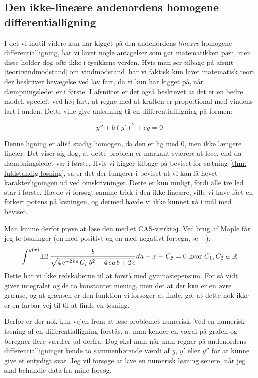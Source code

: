 \subsection{Den ikke-lineære andenordens homogene differentialligning}
\label{teori: Den ikke-linear andenordens ligning}
I det vi indtil videre kun har kigget på den andenordens \textit{lineære} homogene differentialligning, har vi lavet nogle antagelser som gør matematikken pæn, men disse holder dog ofte ikke i fysikkens verden.
Hvis man ser tilbage på afsnit \ref{teori:vindmodstand} om vindmodstand, har vi faktisk kun lavet matematisk teori der beskriver bevægelse ved lav fart, da vi kun har kigget på, når dæmpningsledet er i første. 
I afsnittet er det også beskrevet at det er en bedre model, specielt ved høj fart, at regne med at kraften er proportional med vindens fart i anden.
Dette ville give anledning til en differentiallligning på formen:

$$y'' + b(y')^2 + cy = 0$$

Denne ligning er altså stadig homogen, da den er lig med $0$, men ikke længere lineær. 
Det viser sig dog, at dette problem er markant sværere at løse, end da dæmpningsledet var i første. 
Hvis vi kigger tilbage på beviset for sætning \ref{thm: fuldstandig losning}, så er det der fungerer i beviset at vi kan få hevet karakterligningen ud ved omskrivninger. 
Dette er kun muligt, fordi alle tre led står i første. 
Havde vi forsøgt samme trick i den ikke-lineære, ville vi have fået en forkert potens på løsningen, og dermed havde vi ikke kunnet nå i mål med beviset. 

Man kunne derfor prøve at løse den med et CAS-værktøj. 
Ved brug af Maple får jeg to løsninger (en med positivt og en med negativt fortegn, se $\pm$):
$$\int ^{y \left( x \right) }\!\pm 2\,{\frac {b}{\sqrt {4\,{{\rm e}^{-2\,b{
\it a}}}{\it C_1}\,{b}^{2}-4\,c{\it a}\,b+2\,c}}}{d{\it a}}-x-{
\it C_2}=0 \text{ hvor } C_1,C_2 \in \mathbb{R}
$$
Dette har vi ikke redskaberne til at forstå med gymnasiepensum. 
For så vidt giver integralet og de to konstanter mening, men det at der kun er en øvre grænse, og at grænsen er den funktion vi forsøger at finde, gør at dette nok ikke er en farbar vej til til at finde en løsning. 

Derfor er der nok kun vejen frem at løse problemet numerisk. 
Ved en numerisk løsning af en differentialligning forstås, at man kender en værdi på grafen og beregner flere værdier ud derfra.
Dog skal man når man regner på andenordens differentialligninger kende to sammenhørende værdi af $y$, $y'$ eller $y''$ for at kunne give et entydigt svar.
Jeg vil forsøge at lave en numerisk løsning senere, når jeg skal behandle data fra mine forsøg. 

